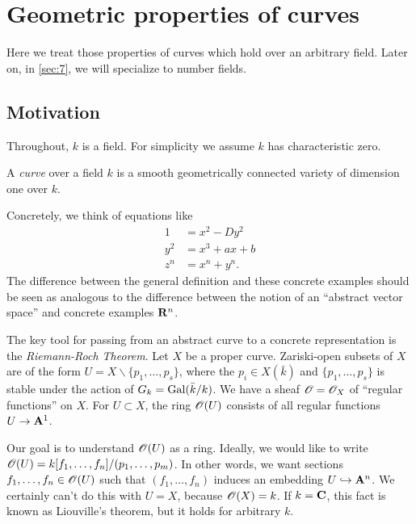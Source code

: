 
\section{Geometric properties of curves}




Here we treat those properties of curves which hold over an arbitrary field. 
Later on, in \autoref{sec:7}, we will specialize to number fields. 





\subsection{Motivation}

Throughout, $k$ is a field. For simplicity we assume $k$ has characteristic 
zero. 

\begin{defi}
A \emph{curve} over a field $k$ is a smooth geometrically connected variety of 
dimension one over $k$. 
\end{defi}

Concretely, we think of equations like 
\begin{align*}
  1 &= x^2 - D y^2 \\
  y^2 &= x^3 + a x+b \\
  z^n &= x^n + y^n .
\end{align*}
The difference between the general definition and these concrete 
examples should be seen as analogous to the difference between the notion of 
an ``abstract vector space'' and concrete examples $\mathbf{R}^n$. 

The key tool for passing from an abstract curve to a concrete representation is 
the \emph{Riemann-Roch Theorem}. Let $X$ be a proper curve. Zariski-open 
subsets of $X$ are of the form $U=X\smallsetminus \{p_1,\dots,p_s\}$, where 
the $p_i\in X(\bar k)$ and $\{p_1,\dots,p_s\}$ is stable under the action of 
$G_k=\operatorname{Gal}(\bar k/k)$. We have a sheaf $\mathscr{O}=\mathscr{O}_X$ of ``regular functions'' 
on $X$. For $U\subset X$, the ring $\mathscr{O}(U)$ consists of all regular functions 
$U\to \mathbf{A}^1$. 

Our goal is to understand $\mathscr{O}(U)$ as a ring. Ideally, we would like to 
write $\mathscr{O}(U)=k[f_1,\dots,f_n]/(p_1,\dots,p_m)$. In other words, we want 
sections $f_1,\dots,f_n\in \mathscr{O}(U)$ such that $(f_1,\dots,f_n)$ induces an 
embedding $U\hookrightarrow \mathbf{A}^n$. We certainly can't do this with $U=X$, 
because $\mathscr{O}(X)=k$. If $k=\mathbf{C}$, this fact is known as Liouville's theorem, but 
it holds for arbitrary $k$. 





